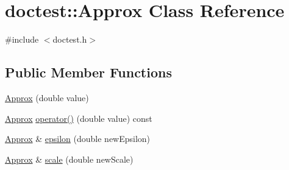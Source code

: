 \hypertarget{classdoctest_1_1_approx}{}\section{doctest\+:\+:Approx Class Reference}
\label{classdoctest_1_1_approx}


{\ttfamily \#include $<$doctest.\+h$>$}

\subsection*{Public Member Functions}
\begin{DoxyCompactItemize}
\item 
\hyperlink{classdoctest_1_1_approx_a86f0d1b44c1cf095697f23ccdab00802}{Approx} (double value)
\item 
\hyperlink{classdoctest_1_1_approx}{Approx} \hyperlink{classdoctest_1_1_approx_aae907c5ea1c4ac94e134db9e35da7dce}{operator()} (double value) const
\item 
\hyperlink{classdoctest_1_1_approx}{Approx} \& \hyperlink{classdoctest_1_1_approx_af8df6b0af00fd875e5b6a0c30b86f636}{epsilon} (double new\+Epsilon)
\item 
\hyperlink{classdoctest_1_1_approx}{Approx} \& \hyperlink{classdoctest_1_1_approx_a62185fd4c09a63dab61bd893574d8473}{scale} (double new\+Scale)
\end{DoxyCompactItemize}
